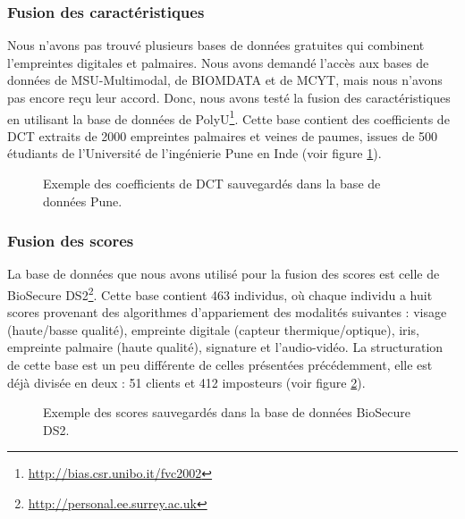 \subsubsection{Fusion des caractéristiques}
Nous n’avons pas trouvé plusieurs bases de données gratuites qui combinent l’empreintes digitales et palmaires. Nous avons demandé l’accès aux bases de données de MSU-Multimodal, de BIOMDATA et de MCYT, mais nous n'avons pas encore reçu leur accord. Donc, nous avons testé la fusion des caractéristiques en utilisant la base de données de PolyU\footnote{\href{http://bias.csr.unibo.it/fvc2002/databases.asp}{http://bias.csr.unibo.it/fvc2002}}. Cette base contient des coefficients de DCT extraits de 2000 empreintes palmaires et veines de paumes, issues de 500 étudiants de l’Université de l’ingénierie Pune en Inde (voir figure \ref{fig:bdd4}). 
\begin{figure}[H]
	\centering
	\caption{Exemple des coefficients de DCT sauvegardés dans la base de données Pune.}
	\label{fig:bdd4}
\end{figure}
\subsubsection{Fusion des scores }
La base de données que nous avons utilisé pour la fusion des scores est celle de BioSecure DS2\footnote{\href{http://personal.ee.surrey.ac.uk/Personal/Norman.Poh/web/fusionq/main.php?bodyfile=entry_page.html}{http://personal.ee.surrey.ac.uk}}. Cette base contient 463 individus, où chaque individu a huit scores provenant des algorithmes d’appariement des modalités suivantes : visage (haute/basse qualité), empreinte digitale (capteur thermique/optique), iris, empreinte palmaire (haute qualité), signature et l'audio-vidéo. La structuration de cette base est un peu différente de celles présentées précédemment, elle est déjà divisée en deux : 51 clients et 412 imposteurs (voir figure \ref{fig:bdd3}).
\begin{figure}[H]
	\centering
	\caption{Exemple des scores sauvegardés dans la base de données BioSecure DS2.}
	\label{fig:bdd3}
\end{figure}
